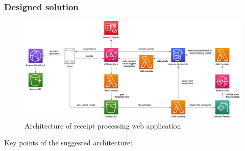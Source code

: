 \subsubsection{Designed solution}

\begin{figure}[]
    \centering
    \includegraphics[width=1\textwidth]{assets/04-serverless-for-web-apps/paragoneArchitecture.png}
    \caption{Architecture of receipt processing web application}
    \label{fig:paragone-web-app}
\end{figure}

Key points of the suggested architecture:

